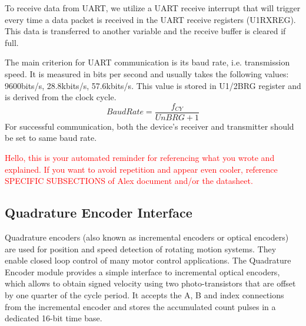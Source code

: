 \noindent
To receive data from UART, we utilize a UART receive interrupt that will trigger every time a data packet is received in the UART receive registers (U1RXREG). This data is transferred to another variable and the receive buffer is cleared if full.


\noindent
The main criterion for UART communication is its baud rate, i.e. transmission speed. It is measured in bits per second and usually takes the following values: 9600bits/s, 28.8kbits/s, 57.6kbits/s.
This value is stored in U1/2BRG register and is derived from the clock cycle.
$$BaudRate = \frac{f_{CY}}{UnBRG+1}$$
For successful communication, both the device’s receiver and transmitter should be set to same baud rate.

\textcolor{red}{Hello, this is your automated reminder for referencing what you wrote and explained. If you want to avoid repetition and appear even cooler, reference SPECIFIC SUBSECTIONS of Alex document and/or the datasheet.}

\subsection{Quadrature Encoder Interface}

Quadrature encoders (also known as incremental encoders or optical encoders) are used for position and speed detection of rotating motion systems. They enable closed loop control of many motor control applications.
\vskip 0.2in
\noindent
The Quadrature Encoder module provides a simple interface to incremental optical encoders, which allows to obtain signed velocity using two photo-transistors that are offset by one quarter of the cycle period. It accepts the A, B and index connections from the incremental encoder and stores the accumulated count pulses in a dedicated 16-bit time base.

